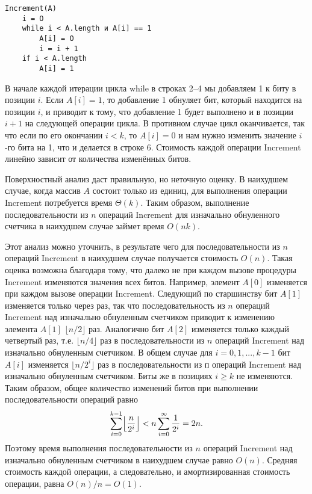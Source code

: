 \begin{verbatim}
Increment(А)
    i = О
    while i < A.length и А[i] == 1
        А[i] = О
        i = i + 1
    if i < A.length
        A[i] = 1
\end{verbatim}

В начале каждой итерации цикла while в строках 2--4 мы добавляем 1 к биту в позиции $i$. Если $A[i] = 1$, то добавление 1 обнуляет бит, который находится на позиции $i$, и приводит к тому, что добавление 1 будет выполнено и в позиции $i + 1$ на следующей операции цикла.
В противном случае цикл оканчивается, так что если по его окончании $i < k$, то $A[i] = 0$ и нам нужно изменить значение $i$-го бита на 1, что и делается в строке 6.
Стоимость каждой операции Increment линейно зависит от количества изменённых битов.

Поверхностный анализ даст правильную, но неточную оценку.
В наихудшем случае, когда массив $A$ состоит только из единиц, для выполнения операции Increment потребуется время $\Theta(k)$.
Таким образом, выполнение последовательности из $n$ операций Increment для изначально обнуленного счетчика в наихудшем случае займет время $O(nk)$.

Этот анализ можно уточнить, в результате чего для последовательности из $n$ операций Increment в наихудшем случае получается стоимость $O(n)$.
Такая оценка возможна благодаря тому, что далеко не при каждом вызове процедуры Increment изменяются значения всех битов. Например, элемент $A[0]$ изменяется при каждом вызове операции Increment.
Следующий по старшинству бит $A[1]$ изменяется только через раз, так что последовательность из $n$ операций Increment над изначально обнуленным счетчиком приводит к изменению элемента $A[1]$ $\lfloor n / 2 \rfloor$ раз.
Аналогично бит $A[2]$ изменяется только каждый четвертый раз, т.е. $\lfloor n / 4 \rfloor$ раз в последовательности из $n$ операций Increment над изначально обнуленным счетчиком.
В общем случае для $i = 0, 1, ... , k - 1$ бит $A[i]$ изменяется $\lfloor n / 2^i \rfloor$ раз в последовательности из п операций Increment над изначально обнуленным счетчиком.
Биты же в позициях $i \ge k$ не изменяются.
Таким образом, общее количество изменений битов при выполнении последовательности операций равно $$\sum_{i = 0}^{k - 1} \Bigl \lfloor \frac{n}{2^i} \Bigr \rfloor < n \sum_{i = 0}^\infty \frac{1}{2^i} = 2n.$$
Поэтому время выполнения последовательности из $n$ операций Increment над изначально обнуленным счетчиком в наихудшем случае равно $O(n)$.
Средняя стоимость каждой операции, а следовательно, и амортизированная стоимость операции, равна $O(n)/n = O(1)$.


